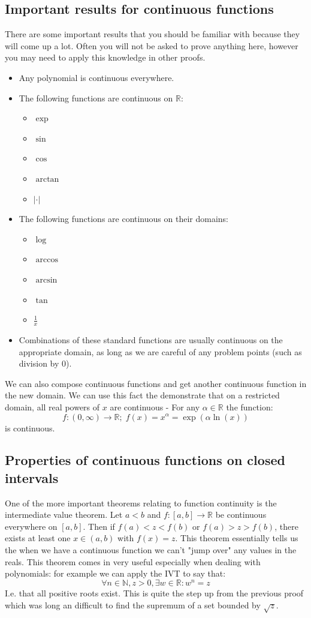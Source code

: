 \documentclass[12pt]{article}
\begin{document}
\subsection*{Important results for continuous functions}
There are some important results that you should be familiar with because they will come up a lot. Often you will not be asked to prove anything here, however you may need to apply this knowledge in other proofs.
\begin{itemize}
    \item Any polynomial is continuous everywhere.
    \item The following functions are continuous on \(\mathbb{R}\):
    \begin{itemize}
        \item \(\exp\)
        \item \(\sin\)
        \item \(\cos\)
        \item \(\arctan\)
        \item \(|\cdot|\)
    \end{itemize}
    \item The following functions are continuous on their domains:
    \begin{itemize}
        \item \(\log\)
        \item \(\arccos\)
        \item \(\arcsin\)
        \item \(\tan\)
        \item \(\frac{1}{x}\)
    \end{itemize}
    \item Combinations of these standard functions are usually continuous on the appropriate domain, as long as we are careful of any problem points (such as division by 0). 
\end{itemize}
We can also compose continuous functions and get another continuous function in the new domain. We can use this fact the demonstrate that on a restricted domain, all real powers of \(x\) are continuous - For any \(\alpha\in\mathbb{R}\) the function:
\[f:(0,\infty)\to\mathbb{R};\;f(x)=x^\alpha=\exp(\alpha\ln(x))\]
is continuous.
\subsection*{Properties of continuous functions on closed intervals}
One of the more important theorems relating to function continuity is the intermediate value theorem. Let \(a<b\) and \(f:[a,b]\to\mathbb{R}\) be continuous everywhere on \([a,b]\). Then if \(f(a)<z<f(b)\) or \(f(a)>z>f(b)\), there exists at least one \(x\in(a,b)\) with \(f(x)=z\). This theorem essentially tells us the when we have a continuous function we can't "jump over" any values in the reals. This theorem comes in very useful especially when dealing with polynomials: for example we can apply the IVT to say that:
\[\forall n\in\mathbb{N}, z>0, \exists w\in\mathbb{R}:w^n=z\]
I.e. that all positive roots exist. This is quite the step up from the previous proof which was long an difficult to find the supremum of a set bounded by \(\sqrt{z}\).
\end{document}
